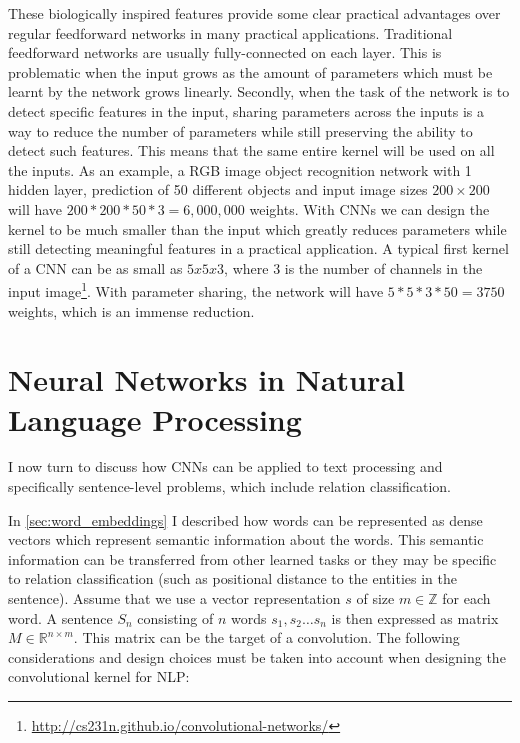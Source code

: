 These biologically inspired features provide some clear practical advantages over regular feedforward networks in many practical applications. 
Traditional feedforward networks are usually fully-connected on each layer. This is problematic when the input grows as the amount of parameters which must be learnt by the network grows linearly. Secondly, when the task of the network is to detect specific features in the input, sharing parameters across the inputs is a way to reduce the number of parameters while still preserving the ability to detect such features. This means that the same entire kernel will be used on all the inputs. 
As an example, a RGB image object recognition network with 1 hidden layer, prediction of 50 different objects and input image sizes $200 \times 200$ will have $200 * 200 * 50 * 3 = 6,000,000$ weights.    
With CNNs we can design the kernel to be much smaller than the input which greatly reduces parameters while still detecting meaningful features in a practical application. A typical first kernel of a CNN can be as small as $5x5x3$, where 3 is the number of channels in the input image\footnote{\url{http://cs231n.github.io/convolutional-networks/}}. With parameter sharing, the network will have $5*5*3*50 = 3750$ weights, which is an immense reduction. 


\section{Neural Networks in Natural Language Processing}

I now turn to discuss how CNNs can be applied to text processing and specifically sentence-level problems, which include relation classification. 




In \autoref{sec:word_embeddings} I described how words can be represented as dense vectors which represent semantic information about the words. This semantic information can be transferred from other learned tasks or they may be specific to relation classification (such as positional distance to the entities in the sentence).
Assume that we use a vector representation $s$ of size $m \in \mathbb{Z}$ for each word.
A sentence $S_n$ consisting of $n$ words $s_1, s_2 \ldots s_n$ is then expressed as matrix $M \in \mathbb{R}^{n \times m}$. This matrix can be the target of a convolution. The following considerations and design choices must be taken into account when designing the convolutional kernel for NLP:

